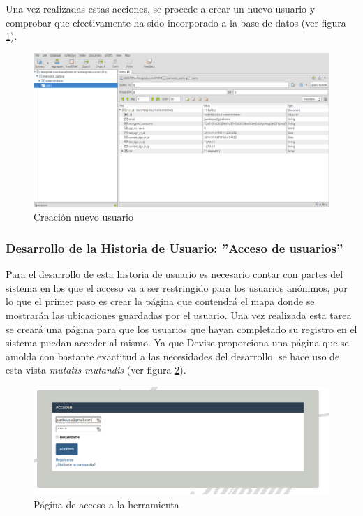 	Una vez realizadas estas acciones, se procede a crear un nuevo usuario y comprobar que efectivamente ha sido incorporado a la base de datos (ver figura \ref{fig:acceso_usuarios_07}).
	
	\begin{figure}[H]
		\centering
		\includegraphics[width=15cm, fbox={\fboxrule} 4mm]{images/05-resultados/10-acceso_usuarios_7.png}
		\caption{Creación nuevo usuario}
		\label{fig:acceso_usuarios_07}
	\end{figure}
	
	\subsubsection{Desarrollo de la Historia de Usuario: ''Acceso de usuarios'' }
	Para el desarrollo de esta historia de usuario es necesario contar con partes del sistema en los que el acceso va a ser restringido para los usuarios anónimos, por lo que el primer paso es crear la página que contendrá el mapa donde se mostrarán las ubicaciones guardadas por el usuario.
	Una vez realizada esta tarea se creará una página para que los usuarios que hayan completado su registro en el sistema puedan acceder al mismo. Ya que Devise proporciona una página que se amolda con bastante exactitud a las necesidades del desarrollo, se hace uso de esta vista \textit{mutatis mutandis} (ver figura \ref{fig:acceso_usuarios_08}).
	
	\begin{figure}[H]
		\centering
		\includegraphics[width=15cm, fbox={\fboxrule} 4mm]{images/05-resultados/11-acceso_usuarios_8.png}
		\caption{Página de acceso a la herramienta}
		\label{fig:acceso_usuarios_08}
	\end{figure}	
	

